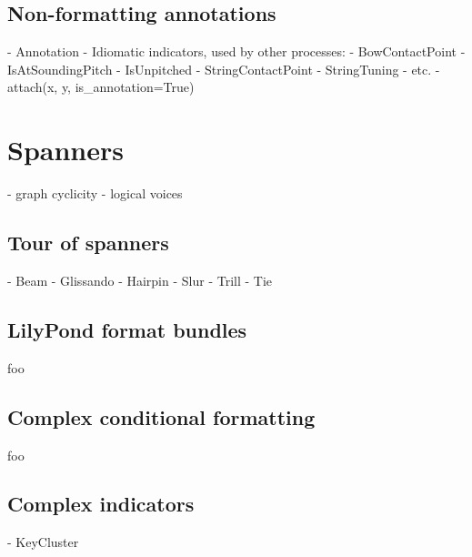 \subsection{Non-formatting annotations}

\begin{markdown}
-   Annotation
-   Idiomatic indicators, used by other processes:
    -   BowContactPoint
    -   IsAtSoundingPitch
    -   IsUnpitched
    -   StringContactPoint
    -   StringTuning
    -   etc.
-   attach(x, y, is_annotation=True)
\end{markdown}

\section{Spanners}

\begin{markdown}
-   graph cyclicity
-   logical voices
\end{markdown}

\subsection{Tour of spanners}

\begin{markdown}
-   Beam
-   Glissando
-   Hairpin
-   Slur
-   Trill
-   Tie
\end{markdown}

\subsection{LilyPond format bundles}

foo

\subsection{Complex conditional formatting}

foo

\subsection{Complex indicators}

\begin{markdown}
-   KeyCluster
\end{markdown}

